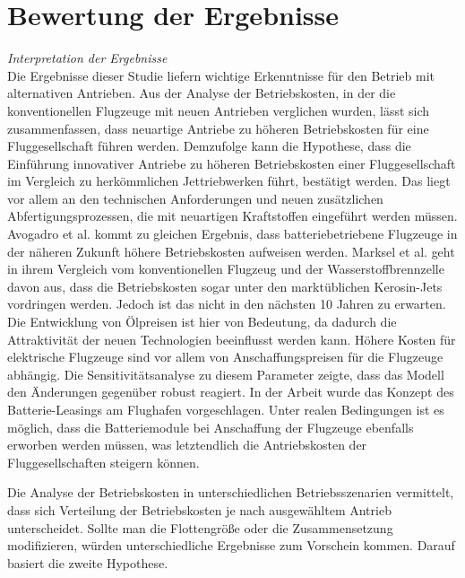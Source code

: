 
\section{Bewertung der Ergebnisse}
\label{s:Bewertung der Ergebnisse}

\textit{Interpretation der Ergebnisse}\\
Die Ergebnisse dieser Studie liefern wichtige Erkenntnisse für den Betrieb mit alternativen Antrieben.
Aus der Analyse der Betriebskosten, in der die konventionellen Flugzeuge mit neuen Antrieben verglichen wurden, 
lässt sich zusammenfassen, dass neuartige Antriebe zu höheren Betriebskosten für eine Fluggesellschaft führen werden.
Demzufolge kann die Hypothese, dass die Einführung innovativer Antriebe zu höheren 
Betriebskosten einer Fluggesellschaft im Vergleich zu herkömmlichen Jettriebwerken führt, bestätigt werden. 
Das liegt vor allem an den technischen Anforderungen und neuen zusätzlichen Abfertigungsprozessen, 
die mit neuartigen Kraftstoffen eingeführt werden müssen. 
Avogadro et al. \cite{avogadro2024demystifying} kommt zu gleichen Ergebnis, 
dass batteriebetriebene Flugzeuge in der näheren Zukunft höhere Betriebskosten aufweisen werden. 
Marksel et al. \cite{marksel2023comparative} geht in ihrem Vergleich vom konventionellen Flugzeug und der Wasserstoffbrennzelle davon aus, 
dass die Betriebskosten sogar unter den marktüblichen Kerosin-Jets vordringen werden. 
Jedoch ist das nicht in den nächsten 10 Jahren zu erwarten. 
Die Entwicklung von Ölpreisen ist hier von Bedeutung, 
da dadurch die Attraktivität der neuen Technologien beeinflusst werden kann.
%
Höhere Kosten für elektrische Flugzeuge sind vor allem von Anschaffungspreisen für die Flugzeuge abhängig. 
Die Sensitivitätsanalyse zu diesem Parameter zeigte, dass das Modell den Änderungen gegenüber robust reagiert.
In der Arbeit wurde das Konzept des Batterie-Leasings am Flughafen vorgeschlagen. 
Unter realen Bedingungen ist es möglich, dass die Batteriemodule bei Anschaffung 
der Flugzeuge ebenfalls erworben werden müssen, 
was letztendlich die Antriebskosten der Fluggesellschaften steigern können. 

%
Die Analyse der Betriebskosten in unterschiedlichen Betriebsszenarien vermittelt, 
dass sich Verteilung der Betriebskosten je nach ausgewähltem Antrieb unterscheidet. 
Sollte man die Flottengröße oder die Zusammensetzung modifizieren, 
würden unterschiedliche Ergebnisse zum Vorschein kommen.
Darauf basiert die zweite Hypothese. 

